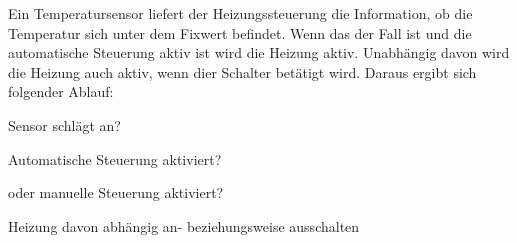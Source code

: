 Ein Temperatursensor liefert der Heizungssteuerung die Information, ob die Temperatur sich unter dem Fixwert befindet. Wenn das der Fall ist und die automatische Steuerung aktiv ist wird die Heizung aktiv. Unabhängig davon wird die Heizung auch aktiv, wenn dier Schalter betätigt wird. Daraus ergibt sich folgender Ablauf:
\item{Sensor schlägt an?}
\item{Automatische Steuerung aktiviert?}
\item{oder manuelle Steuerung aktiviert?}
\item{Heizung davon abhängig an- beziehungsweise ausschalten}
